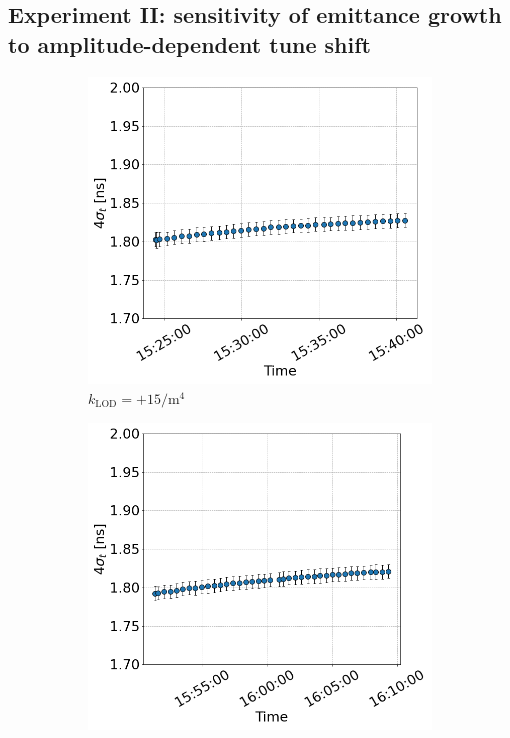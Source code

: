   \newpage


 \subsection{Experiment II: sensitivity of emittance growth to amplitude-dependent tune shift}\label{subsec:2022_exp2_bunch_length}

  \begin{figure}[htp]
     \centering
     \begin{subfigure}{.45\textwidth}
         \centering
         \includegraphics[width=.95\linewidth]{images/app_c/bunch_length_COAST_06.png}  
         \caption{$k_\mathrm{LOD}=+15 \mathrm{/m^{4}}$}
     \end{subfigure}
     \begin{subfigure}{.45\textwidth}
         \centering
         \includegraphics[width=.95\linewidth]{images/app_c/bunch_length_COAST_07.png}  

\end{subfigure}
\end{figure}
